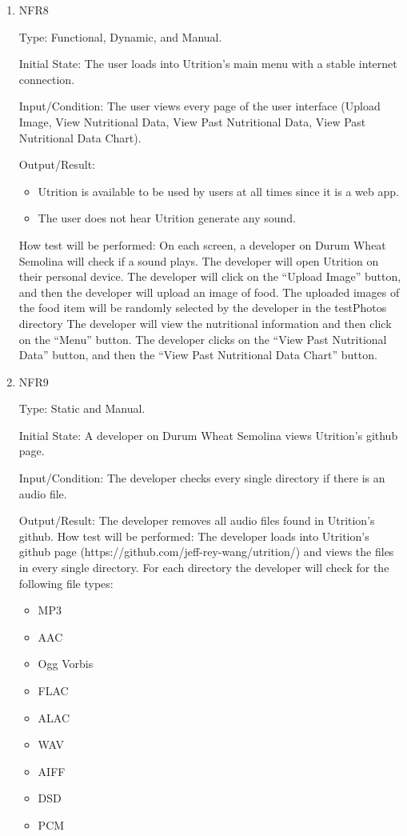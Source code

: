 \documentclass[12pt, titlepage]{article}
\begin{document}
\begin{enumerate}
		\item{NFR8\\}
		
		Type: Functional, Dynamic, and Manual.
		
		Initial State: The user loads into Utrition’s main menu with a stable internet connection.
		
		Input/Condition: The user views every page of the user interface (Upload Image, View Nutritional Data, View Past Nutritional Data, View Past Nutritional Data Chart).
		
		Output/Result: 
		\begin{itemize}
			\item Utrition is available to be used by users at all times since it is a web app.
			\item The user does not hear Utrition generate any sound.
		\end{itemize}
		
		How test will be performed: On each screen, a developer on Durum Wheat Semolina will check if a sound plays. The developer will open Utrition on their personal device. The developer will click on the “Upload Image” button, and then the developer will upload an image of food. The uploaded images of the food item will be randomly selected by the developer in the testPhotos directory The developer will view the nutritional information and then click on the “Menu” button. The developer clicks on the “View Past Nutritional Data” button, and then the “View Past Nutritional Data Chart” button.
		
		\item{NFR9\\}
		
		Type: Static and Manual.
		
		Initial State: A developer on Durum Wheat Semolina views Utrition’s github page. 
		
		Input/Condition: The developer checks every single directory if there is an audio file.
		
		Output/Result: The developer removes all audio files found in Utrition’s github.
		How test will be performed: The developer loads into Utrition’s github page (https://github.com/jeff-rey-wang/utrition/) and views the files in every single directory. For each directory the developer will check for the following file types:
		
		\begin{itemize}
			\item MP3
			\item AAC
			\item Ogg Vorbis
			\item FLAC
			\item ALAC
			\item WAV
			\item AIFF
			\item DSD
			\item PCM
		\end{itemize}
	\end{enumerate}
	
\end{document}

